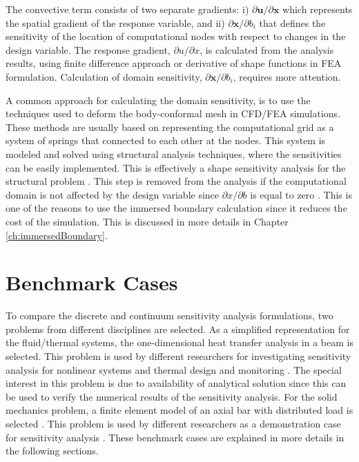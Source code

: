 The convective term consists of two separate gradients: i) $\partial \mathbf{u} / \partial \mathbf{x}$ which represents the spatial gradient of the response variable, and ii) $\partial \mathbf{x} / \partial b_i$ that defines the sensitivity of the location of computational nodes with respect to changes in the design variable. The response gradient, $\partial u/\partial x$, is calculated from the analysis results, using finite difference approach or derivative of shape functions in FEA formulation. Calculation of domain sensitivity, $\partial \mathbf{x} / \partial b_i$, requires more attention.

A common approach for calculating the domain sensitivity, is to use the techniques used to deform the body-conformal mesh in CFD/FEA simulations. These methods are usually based on representing the computational grid as a system of springs that connected to each other at the nodes. This system is modeled and solved using structural analysis techniques, where the sensitivities can be easily implemented. This is effectively a shape sensitivity analysis for the structural problem \cite{haftka1986structural}. This step is removed from the analysis if the computational domain is not affected by the design variable since $\partial x/\partial b$ is equal to zero \cite{gobal2014continuum}. This is one of the reasons to use the immersed boundary calculation since it reduces the cost of the simulation. This is discussed in more details in Chapter \ref{ch:immersedBoundary}.

\section{Benchmark Cases}
To compare the discrete and continuum sensitivity analysis formulations, two problems from different disciplines are selected. As a simplified representation for the fluid/thermal systems, the one-dimensional heat transfer analysis in a beam is selected. This problem is used by different researchers for investigating sensitivity analysis for nonlinear systems \cite{dowding2001sensitivity} and thermal design and monitoring \cite{szopa2005second, sorli2004computational}. The special interest in this problem is due to availability of analytical solution since this can be used to verify the numerical results of the sensitivity analysis. For the solid mechanics problem, a finite element model of an axial bar with distributed load is selected \cite{szabo1991finite}. This problem is used by different researchers as a demonstration case for sensitivity analysis \cite{cross2014local, wickert2009least}. These benchmark cases are explained in more details in the following sections.

